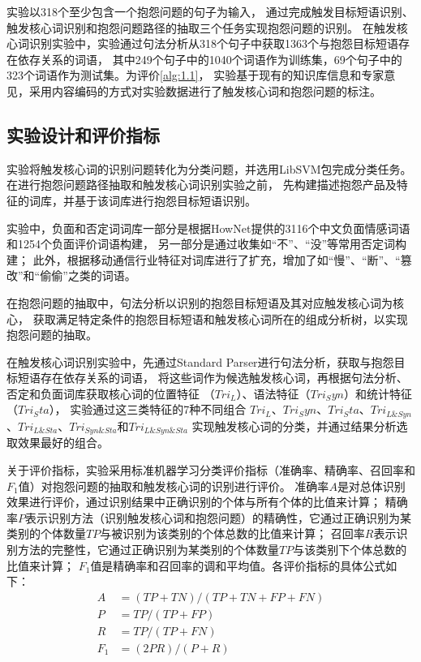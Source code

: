 实验以318个至少包含一个抱怨问题的句子为输入，
通过完成触发目标短语识别、触发核心词识别和抱怨问题路径的抽取三个任务实现抱怨问题的识别。
在触发核心词识别实验中，实验通过句法分析从318个句子中获取1363个与抱怨目标短语存在依存关系的词语，
其中249个句子中的1040个词语作为训练集，69个句子中的323个词语作为测试集。为评价\autoref{alg:1.1}，
实验基于现有的知识库信息和专家意见，采用内容编码的方式对实验数据进行了触发核心词和抱怨问题的标注。

\subsection{实验设计和评价指标}\label{subsection:1.4.2}

实验将触发核心词的识别问题转化为分类问题，并选用LibSVM包完成分类任务。
在进行抱怨问题路径抽取和触发核心词识别实验之前，
先构建描述抱怨产品及特征的词库，并基于该词库进行抱怨目标短语识别。

实验中，负面和否定词词库一部分是根据HowNet提供的3116个中文负面情感词语和1254个负面评价词语构建，
另一部分是通过收集如“不”、“没”等常用否定词构建；
此外，根据移动通信行业特征对词库进行了扩充，增加了如“慢”、“断”、“篡改”和“偷偷”之类的词语。

在抱怨问题的抽取中，句法分析以识别的抱怨目标短语及其对应触发核心词为核心，
获取满足特定条件的抱怨目标短语和触发核心词所在的组成分析树，以实现抱怨问题的抽取。

在触发核心词识别实验中，先通过Standard Parser进行句法分析，获取与抱怨目标短语存在依存关系的词语，
将这些词作为候选触发核心词，再根据句法分析、否定和负面词库获取核心词的位置特征
（$Tri_L$）、语法特征（$Tri_Syn$）和统计特征（$Tri_Sta$），
实验通过这三类特征的7种不同组合
$Tri_L$、$Tri_Syn$、$Tri_Sta$、$Tri_{L\&Syn}$、$Tri_{L\&Sta}$、$Tri_{Syn\&Sta}$和$Tri_{L\&Syn\&Sta}$
实现触发核心词的分类，并通过结果分析选取效果最好的组合。

关于评价指标，实验采用标准机器学习分类评价指标（准确率、精确率、召回率和$F_1$值）\cite{cortes1995support}对抱怨问题的抽取和触发核心词的识别进行评价。
准确率$A$是对总体识别效果进行评价，通过识别结果中正确识别的个体与所有个体的比值来计算；
精确率$P$表示识别方法（识别触发核心词和抱怨问题）的精确性，它通过正确识别为某类别的个体数量$TP$与被识别为该类别的个体总数的比值来计算；
召回率$R$表示识别方法的完整性，它通过正确识别为某类别的个体数量$TP$与该类别下个体总数的比值来计算；
$F_1$值是精确率和召回率的调和平均值。各评价指标的具体公式如下：
\begin{align}
    A &=(TP+TN)/(TP+TN+FP+FN)\\ 
    P &=TP/(TP+FP)\\
    R &=TP/(TP+FN)\\
    F_1 &=(2PR)/(P+R)
\end{align}


